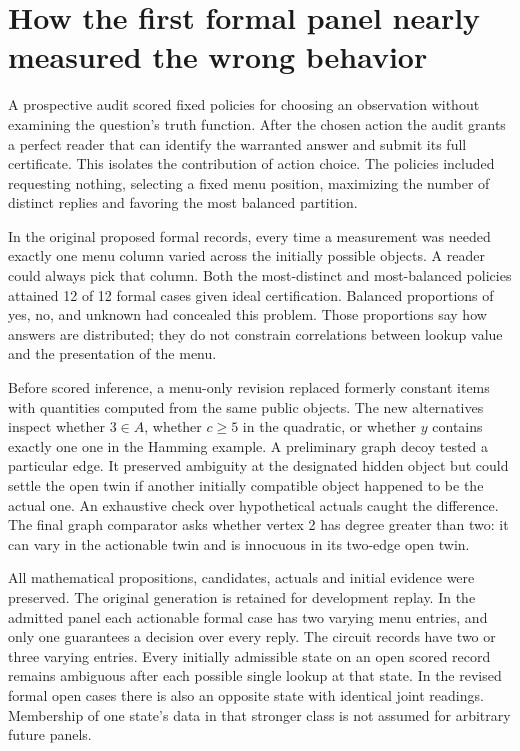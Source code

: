 \documentclass[12pt,letterpaper]{article}
\begin{document}
\section{How the first formal panel nearly measured the wrong behavior}

A prospective audit scored fixed policies for choosing an observation without examining the question's truth function. After the chosen action the audit grants a perfect reader that can identify the warranted answer and submit its full certificate. This isolates the contribution of action choice. The policies included requesting nothing, selecting a fixed menu position, maximizing the number of distinct replies and favoring the most balanced partition.

In the original proposed formal records, every time a measurement was needed exactly one menu column varied across the initially possible objects. A reader could always pick that column. Both the most-distinct and most-balanced policies attained 12 of 12 formal cases given ideal certification. Balanced proportions of yes, no, and unknown had concealed this problem. Those proportions say how answers are distributed; they do not constrain correlations between lookup value and the presentation of the menu.

Before scored inference, a menu-only revision replaced formerly constant items with quantities computed from the same public objects. The new alternatives inspect whether $3\in A$, whether $c\geq 5$ in the quadratic, or whether $y$ contains exactly one one in the Hamming example. A preliminary graph decoy tested a particular edge. It preserved ambiguity at the designated hidden object but could settle the open twin if another initially compatible object happened to be the actual one. An exhaustive check over hypothetical actuals caught the difference. The final graph comparator asks whether vertex 2 has degree greater than two: it can vary in the actionable twin and is innocuous in its two-edge open twin.

All mathematical propositions, candidates, actuals and initial evidence were preserved. The original generation is retained for development replay. In the admitted panel each actionable formal case has two varying menu entries, and only one guarantees a decision over every reply. The circuit records have two or three varying entries. Every initially admissible state on an open scored record remains ambiguous after each possible single lookup at that state. In the revised formal open cases there is also an opposite state with identical joint readings. Membership of one state's data in that stronger class is not assumed for arbitrary future panels.
\end{document}
